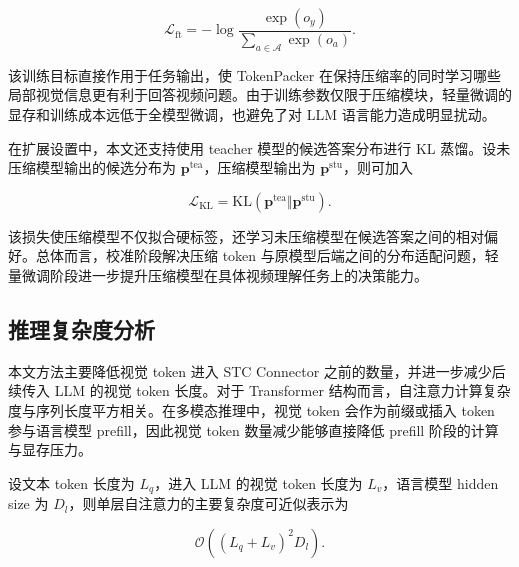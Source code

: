 \begin{equation}
    \label{equ:method-finetune-loss}
    \mathcal{L}_{\mathrm{ft}}
    =
    -\log
    \frac{\exp(o_y)}
    {\sum_{a\in\mathcal{A}}\exp(o_a)}.
\end{equation}

\par 该训练目标直接作用于任务输出，使 TokenPacker 在保持压缩率的同时学习哪些局部视觉信息更有利于回答视频问题。由于训练参数仅限于压缩模块，轻量微调的显存和训练成本远低于全模型微调，也避免了对 LLM 语言能力造成明显扰动。

\par 在扩展设置中，本文还支持使用 teacher 模型的候选答案分布进行 KL 蒸馏。设未压缩模型输出的候选分布为 $\mathbf{p}^{\mathrm{tea}}$，压缩模型输出为 $\mathbf{p}^{\mathrm{stu}}$，则可加入

\begin{equation}
    \label{equ:method-choice-kl}
    \mathcal{L}_{\mathrm{KL}}
    =
    \mathrm{KL}
    \left(
        \mathbf{p}^{\mathrm{tea}}
        \Vert
        \mathbf{p}^{\mathrm{stu}}
    \right).
\end{equation}

\par 该损失使压缩模型不仅拟合硬标签，还学习未压缩模型在候选答案之间的相对偏好。总体而言，校准阶段解决压缩 token 与原模型后端之间的分布适配问题，轻量微调阶段进一步提升压缩模型在具体视频理解任务上的决策能力。

\subsection{推理复杂度分析}

\par 本文方法主要降低视觉 token 进入 STC Connector 之前的数量，并进一步减少后续传入 LLM 的视觉 token 长度。对于 Transformer 结构而言，自注意力计算复杂度与序列长度平方相关\cite{transformer2017}。在多模态推理中，视觉 token 会作为前缀或插入 token 参与语言模型 prefill，因此视觉 token 数量减少能够直接降低 prefill 阶段的计算与显存压力。

\par 设文本 token 长度为 $L_q$，进入 LLM 的视觉 token 长度为 $L_v$，语言模型 hidden size 为 $D_l$，则单层自注意力的主要复杂度可近似表示为

\begin{equation}
    \label{equ:method-llm-complexity}
    \mathcal{O}
    \left(
        (L_q+L_v)^2 D_l
    \right).
\end{equation}

